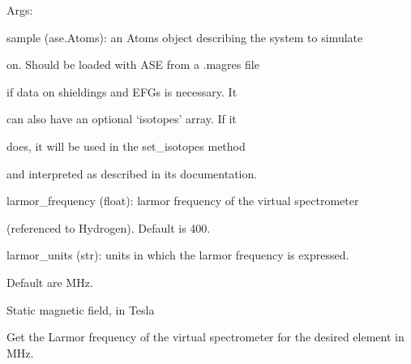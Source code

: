 \documentclass[letterpaper,10pt,english]{sphinxmanual}
\begin{document}
\begin{fulllineitems}
\begin{DUlineblock}{0em}
\item[] Args:
\item[]
\begin{DUlineblock}{\DUlineblockindent}
\item[] sample (ase.Atoms): an Atoms object describing the system to simulate
\item[]
\begin{DUlineblock}{\DUlineblockindent}
\item[] on. Should be loaded with ASE from a .magres file
\item[] if data on shieldings and EFGs is necessary. It
\item[] can also have an optional `isotopes' array. If it
\item[] does, it will be used in the set\_isotopes method
\item[] and interpreted as described in its documentation.
\end{DUlineblock}
\item[] larmor\_frequency (float): larmor frequency of the virtual spectrometer
\item[]
\begin{DUlineblock}{\DUlineblockindent}
\item[] (referenced to Hydrogen). Default is 400.
\end{DUlineblock}
\item[] larmor\_units (str): units in which the larmor frequency is expressed.
\item[]
\begin{DUlineblock}{\DUlineblockindent}
\item[] Default are MHz.
\end{DUlineblock}
\end{DUlineblock}
\end{DUlineblock}

\begin{fulllineitems}
\label{doctree/soprano.calculate.nmr.nmr:soprano.calculate.nmr.nmr.NMRCalculator.B}
Static magnetic field, in Tesla

\end{fulllineitems}


\begin{fulllineitems}
\label{doctree/soprano.calculate.nmr.nmr:soprano.calculate.nmr.nmr.NMRCalculator.get_larmor_frequency}
Get the Larmor frequency of the virtual spectrometer for the desired
element in MHz.


\end{fulllineitems}
\end{fulllineitems}
\end{document}

